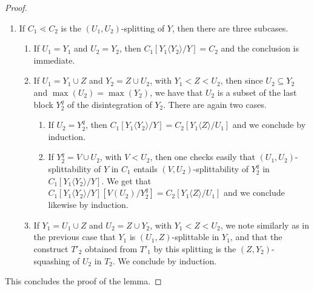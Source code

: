 \documentclass{article}
\theoremstyle{plain}
\theoremstyle{definition}
\newcommand{\inc}{\subseteq}
\begin{document}
\begin{proof}
\begin{enumerate}
\begin{figure}[H]
{} 
\caption{Case 3.(b). }
\label{illustrative-picture}
\end{figure}
\item If $C_1\lessdot C_2$ is the $(U_1,U_2)$-splitting of $Y$, then there are three subcases.
\begin{enumerate}
\item If $U_1=Y_1$ and $U_2=Y_2$, then $ C_1[Y_1\langle Y_2 \rangle /Y]=C_2$ and the conclusion is immediate.
\item If $U_1=Y_1\cup Z$ and $Y_2=Z\cup U_2$, with $Y_1<Z<U_2$, then since $U_2\inc Y_2$ and $\max(U_2)=\max(Y_2)$, we have that $U_2$ is a subset of the last block $Y_2^q$ of the disintegration of 
$Y_2$. There are again two cases.
\begin{enumerate}
\item If $U_2=Y_2^q$, then $C_1[Y_1\langle Y_2\rangle/Y]=C_2[Y_1\langle Z\rangle /U_1]$ and we conclude by induction.
\item If $Y_2^q=V\cup U_2$, with $V<U_2$, then one checks easily that $(U_1,U_2)$-splittability of $Y$ in $C_1$ entails $(V,U_2)$-splittability of $Y_2^q$ in $C_1[Y_1\langle Y_2\rangle/Y]$. We get that $C_1[Y_1\langle Y_2\rangle/Y][V(U_2)/Y_2^q]=C_2[Y_1\langle Z\rangle /U_1]$ and we conclude likewise by induction. 
\end{enumerate}
\item If $Y_1=U_1\cup Z$ and $U_2=Z\cup Y_2$, with $Y_1<Z<U_2$, we note similarly as in the previous case that $Y_1$ is $(U_1,Z)$-splittable in $Y_1$, and that the construct $T'_2$ obtained from $T'_1$ by this splitting is the $(Z,Y_2)$-squashing of $U_2$ in $T_2$. We conclude by induction.
\end{enumerate}
 \end{enumerate} 
This concludes the proof of the lemma.
\end{proof}
\end{document}
